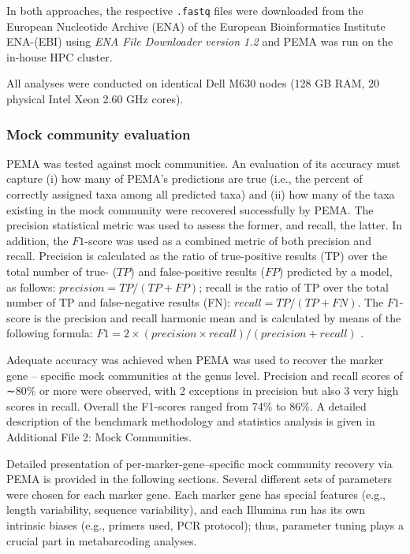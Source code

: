       In both approaches, the respective \texttt{.fastq} files were downloaded from the European Nucleotide Archive (ENA) of the European Bioinformatics Institute ENA-(EBI) using \textit{ENA File Downloader version 1.2} \cite{harrison2019european} and PEMA was run on the in-house HPC cluster.

      All analyses were conducted on identical Dell M630 nodes (128 GB RAM, 20 physical Intel Xeon 2.60 GHz cores).


   \subsubsection*{Mock community evaluation}

      PEMA was tested against mock communities. 
      An evaluation of its accuracy must capture 
      (i) how many of PEMA's predictions are true (i.e., the percent of correctly assigned taxa among all predicted taxa) and 
      (ii) how many of the taxa existing in the mock community were recovered successfully by PEMA. 
      The precision statistical metric was used to assess the former, and recall, the latter. 
      In addition, the $F1$-score was used as a combined metric of both precision and recall. 
      Precision is calculated as the ratio of true-positive results (TP) over the total number of true- ($TP$) and false-positive results ($FP$) predicted by a model, as follows: $precision = TP/(TP + FP)$; 
      recall is the ratio of TP over the total number of TP and false-negative results (FN): $recall = TP/(TP + FN)$. 
      The $F1$-score is the precision and recall harmonic mean and is calculated by means of the following formula: 
      $F1 = 2 × (precision × recall)/(precision + recall)$ \cite{sammut2011encyclopedia}.

      Adequate accuracy was achieved when PEMA was used to recover the marker gene – specific mock communities at the genus level.
      Precision and recall scores of ∼80\% or more were observed, with 2 exceptions in precision but also 3 very high scores in recall. 
      Overall the F1-scores ranged from 74\% to 86\%. 
      A detailed description of the benchmark methodology and statistics analysis is given in Additional File 2: Mock Communities.

      Detailed presentation of per-marker-gene–specific mock community recovery via PEMA is provided in the following sections. 
      Several different sets of parameters were chosen for each marker gene. 
      Each marker gene has special features (e.g., length variability, sequence variability), and each Illumina run has its own intrinsic biases (e.g., primers used, PCR protocol); 
      thus, parameter tuning plays a crucial part in metabarcoding analyses.

